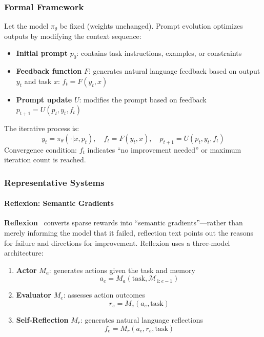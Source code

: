 \subsubsection{Formal Framework}

\begin{definition}
Let the model $\pi_\theta$ be fixed (weights unchanged). Prompt evolution optimizes outputs by modifying the context sequence:
\begin{itemize}
\item \textbf{Initial prompt} $p_0$: contains task instructions, examples, or constraints
\item \textbf{Feedback function} $F$: generates natural language feedback based on output $y_t$ and task $x$: $f_t = F(y_t, x)$
\item \textbf{Prompt update} $U$: modifies the prompt based on feedback $p_{t+1} = U(p_t, y_t, f_t)$
\end{itemize}
The iterative process is:
\begin{equation}
y_t = \pi_\theta(\cdot | x, p_t), \quad f_t = F(y_t, x), \quad p_{t+1} = U(p_t, y_t, f_t)
\label{eq:prompt-evolve}
\end{equation}
Convergence condition: $f_t$ indicates ``no improvement needed'' or maximum iteration count is reached.
\end{definition}

\subsubsection{Representative Systems}

\paragraph{Reflexion: Semantic Gradients}

\textbf{Reflexion}~\citep{reflexion2023} converts sparse rewards into ``semantic gradients''---rather than merely informing the model that it failed, reflection text points out the reasons for failure and directions for improvement. Reflexion uses a three-model architecture:

\begin{enumerate}
\item \textbf{Actor} $M_a$: generates actions given the task and memory
\begin{equation}
a_e = M_a(\text{task}, \mathcal{M}_{1:e-1})
\label{eq:reflexion-actor}
\end{equation}

\item \textbf{Evaluator} $M_e$: assesses action outcomes
\begin{equation}
r_e = M_e(a_e, \text{task})
\label{eq:reflexion-eval}
\end{equation}

\item \textbf{Self-Reflection} $M_r$: generates natural language reflections
\begin{equation}
f_e = M_r(a_e, r_e, \text{task})
\label{eq:reflexion-reflect}
\end{equation}
\end{enumerate}

